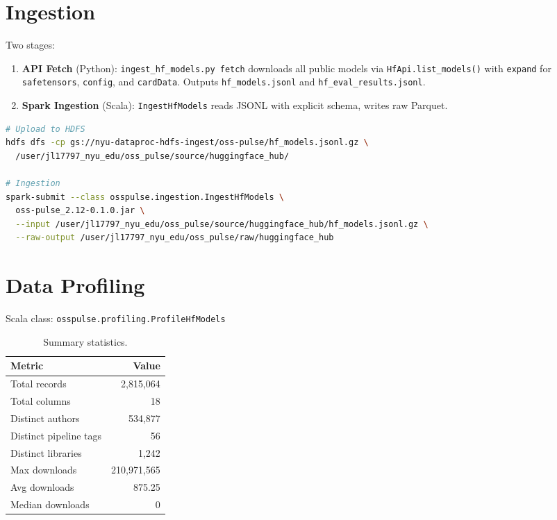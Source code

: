 \documentclass[11pt]{article}
\begin{document}
\section{Ingestion}

Two stages:

\begin{enumerate}
  \item \textbf{API Fetch} (Python): \texttt{ingest\_hf\_models.py fetch} downloads all public models via \texttt{HfApi.list\_models()} with \texttt{expand} for \texttt{safetensors}, \texttt{config}, and \texttt{cardData}. Outputs \texttt{hf\_models.jsonl} and \texttt{hf\_eval\_results.jsonl}.
  \item \textbf{Spark Ingestion} (Scala): \texttt{IngestHfModels} reads JSONL with explicit schema, writes raw Parquet.
\end{enumerate}

\begin{lstlisting}[language=bash,caption={Commands run on NYU Dataproc}]
# Upload to HDFS
hdfs dfs -cp gs://nyu-dataproc-hdfs-ingest/oss-pulse/hf_models.jsonl.gz \
  /user/jl17797_nyu_edu/oss_pulse/source/huggingface_hub/

# Ingestion
spark-submit --class osspulse.ingestion.IngestHfModels \
  oss-pulse_2.12-0.1.0.jar \
  --input /user/jl17797_nyu_edu/oss_pulse/source/huggingface_hub/hf_models.jsonl.gz \
  --raw-output /user/jl17797_nyu_edu/oss_pulse/raw/huggingface_hub
\end{lstlisting}

\section{Data Profiling}

Scala class: \texttt{osspulse.profiling.ProfileHfModels}

\begin{table}[H]
\centering
\begin{tabular}{lr}
\toprule
\textbf{Metric} & \textbf{Value} \\
\midrule
Total records      & 2,815,064 \\
Total columns      & 18 \\
Distinct authors   & 534,877 \\
Distinct pipeline tags & 56 \\
Distinct libraries & 1,242 \\
Max downloads      & 210,971,565 \\
Avg downloads      & 875.25 \\
Median downloads   & 0 \\
\bottomrule
\end{tabular}
\caption{Summary statistics.}
\end{table}
\end{document}
